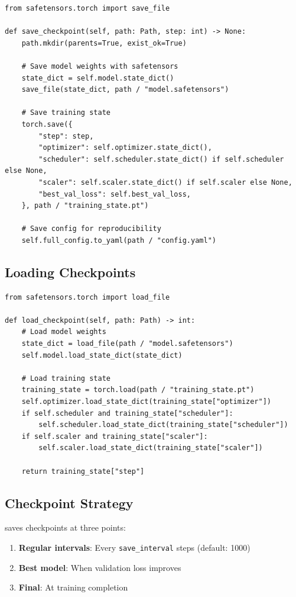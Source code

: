 \begin{lstlisting}[style=python, caption={Checkpoint saving from trainer.py}]
from safetensors.torch import save_file

def save_checkpoint(self, path: Path, step: int) -> None:
    path.mkdir(parents=True, exist_ok=True)

    # Save model weights with safetensors
    state_dict = self.model.state_dict()
    save_file(state_dict, path / "model.safetensors")

    # Save training state
    torch.save({
        "step": step,
        "optimizer": self.optimizer.state_dict(),
        "scheduler": self.scheduler.state_dict() if self.scheduler else None,
        "scaler": self.scaler.state_dict() if self.scaler else None,
        "best_val_loss": self.best_val_loss,
    }, path / "training_state.pt")

    # Save config for reproducibility
    self.full_config.to_yaml(path / "config.yaml")
\end{lstlisting}

\subsection{Loading Checkpoints}

\begin{lstlisting}[style=python, caption={Checkpoint loading from trainer.py}]
from safetensors.torch import load_file

def load_checkpoint(self, path: Path) -> int:
    # Load model weights
    state_dict = load_file(path / "model.safetensors")
    self.model.load_state_dict(state_dict)

    # Load training state
    training_state = torch.load(path / "training_state.pt")
    self.optimizer.load_state_dict(training_state["optimizer"])
    if self.scheduler and training_state["scheduler"]:
        self.scheduler.load_state_dict(training_state["scheduler"])
    if self.scaler and training_state["scaler"]:
        self.scaler.load_state_dict(training_state["scaler"])

    return training_state["step"]
\end{lstlisting}

\subsection{Checkpoint Strategy}

\TryLM saves checkpoints at three points:
\begin{enumerate}
    \item \textbf{Regular intervals}: Every \texttt{save\_interval} steps (default: 1000)
    \item \textbf{Best model}: When validation loss improves
    \item \textbf{Final}: At training completion
\end{enumerate}

